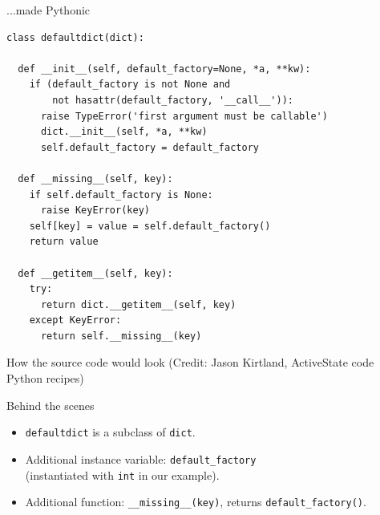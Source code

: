 \documentclass{beamer}
\begin{document}
\begin{frame}{...made Pythonic}
\vspace{1.5em}
{\usebox{\mysavebox}}
\vspace{1em}
\end{frame}

\lstset{ %
  basicstyle=\ttfamily\scriptsize,        %
}

\begin{lrbox}{\mysavebox}
\begin{lstlisting}
class defaultdict(dict):

  def __init__(self, default_factory=None, *a, **kw):
    if (default_factory is not None and
        not hasattr(default_factory, '__call__')):
      raise TypeError('first argument must be callable')
      dict.__init__(self, *a, **kw)
      self.default_factory = default_factory

  def __missing__(self, key):
    if self.default_factory is None:
      raise KeyError(key)
    self[key] = value = self.default_factory()
    return value

  def __getitem__(self, key):
    try:
      return dict.__getitem__(self, key)
    except KeyError:
      return self.__missing__(key)
\end{lstlisting}

\end{lrbox}

\begin{frame}{How the source code would look}
\vspace{0.5em}
{\usebox{\mysavebox}}
\vspace{1em}
{\scriptsize (Credit: Jason Kirtland, ActiveState code Python recipes})
\end{frame}

\lstset{ %
  basicstyle=\ttfamily\normalsize,        %
}

\begin{frame}{Behind the scenes}

\begin{itemize}
  \item \lstinline$defaultdict$ is a subclass of \lstinline$dict$.
  \item Additional instance variable: \lstinline$default_factory$ \\
        (instantiated with \lstinline$int$ in our example).
  \item Additional function:  \lstinline$__missing__(key)$, returns \lstinline$default_factory()$. 
\end{itemize}
\end{frame}
\end{document}

